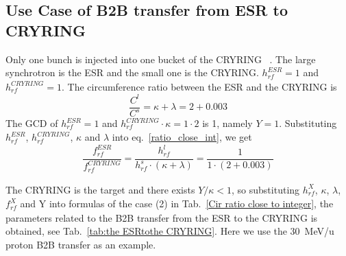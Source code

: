 \subsection{Use Case of B2B transfer from ESR to CRYRING}
Only one bunch is injected into one bucket of the CRYRING ~\cite{herfurth_low_2013, lestinsky_cryring_2015}. The large synchrotron is the ESR and the small one is the CRYRING. $h^{\mathit{ESR}}_\mathit{rf}=1$ and $h^{\mathit{CRYRING}}_\mathit{rf}=1$. The circumference ratio between the ESR and the CRYRING is
\begin{equation}
\frac{C^l}{C^s}=\kappa + \lambda =2+0.003
\end{equation}
The GCD of $h^{\mathit{ESR}}_\mathit{rf}=1$ and $h^{\mathit{CRYRING}}_\mathit{rf} \cdot \kappa=1\cdot 2$ is 1, namely $Y=1$. Substituting $h^{\mathit{ESR}}_\mathit{rf}$, $h^{\mathit{CRYRING}}_\mathit{rf}$, $\kappa$ and $\lambda$ into eq.~\ref{ratio_close_int}, we get
\begin{equation}
\frac {f_{\mathit{rf}}^{\mathit{ESR}}}{f_{\mathit{rf}}^{\mathit{CRYRING}}}= \frac{h^l_\mathit{rf}}{h^s_\mathit{rf} \cdot (\kappa+ \lambda)}=\frac {1}{1 \cdot(2+0.003)}
\end{equation}

The CRYRING is the target and there exists $Y/\kappa<1$, so substituting $h^X_\mathit{rf}$, $\kappa$, $\lambda$, $f_{\mathit{rf}}^{X}$ and Y into formulas of the case (2) in Tab.~\ref{Cir ratio close to integer}, the parameters related to the B2B transfer from the ESR to the CRYRING is obtained, see Tab.~\ref{tab:the ESRtothe CRYRING}. Here we use the \SI{30}{MeV/\atomicmassunit} proton B2B transfer as an example. 

